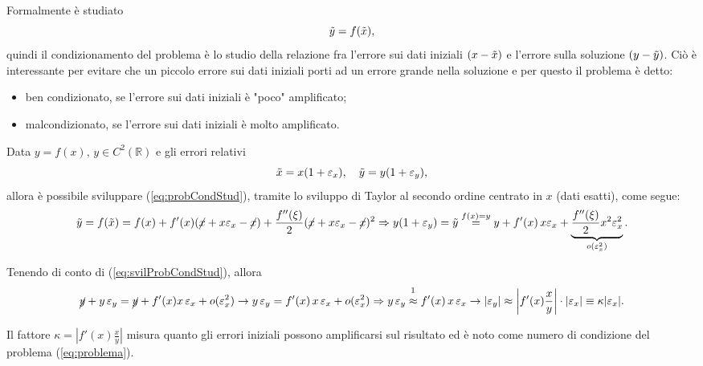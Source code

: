 Formalmente è studiato
\begin{equation}\label{eq:probCondStud}
	\Tilde{y}=f(\Tilde{x}),
\end{equation}
quindi il condizionamento del problema è lo studio della relazione fra l'errore sui dati iniziali $(x-\Tilde{x})$ e l'errore sulla soluzione $(y-\Tilde{y})$. Ciò è interessante per evitare che un piccolo errore sui dati iniziali porti ad un errore grande nella soluzione e per questo il problema è detto:
\begin{itemize}
	\item ben condizionato, se l'errore sui dati iniziali è "poco" amplificato;
	\item malcondizionato, se l'errore sui dati iniziali è molto amplificato.
\end{itemize}

Data $y=f(x),\, y\in C^2(\mathbb{R})$ e gli errori relativi \begin{equation*}
	\Tilde{x}=x(1+\varepsilon_x),\quad \Tilde{y}=y(1+\varepsilon_y),
\end{equation*}
allora è possibile sviluppare (\ref{eq:probCondStud}), tramite lo sviluppo di Taylor al secondo ordine centrato in $x$ (dati esatti), come segue:
\begin{equation}\label{eq:svilProbCondStud}
	\Tilde{y}=f(\Tilde{x})=f(x)+f'(x)(\cancel{x}+x\varepsilon_x-\cancel{x})+\frac{f''(\xi)}{2}(\cancel{x}+x\varepsilon_x-\cancel{x})^2\Rightarrow y(1+\varepsilon_y)=\Tilde{y}\overset{f(x)=y}{=}y+f'(x)\, x\varepsilon_x+\underbrace{\frac{f''(\xi)}{2}x^2\varepsilon_x^2}_{o(\varepsilon_x^2)}.
\end{equation}

Tenendo di conto di (\ref{eq:svilProbCondStud}), allora
\begin{equation*}
	\cancel{y}+y\,\varepsilon_y=\cancel{y}+f'(x)x\,\varepsilon_x+o(\varepsilon_x^2)\rightarrow y\,\varepsilon_y=f'(x)\,x\,\varepsilon_x+o(\varepsilon_x^2)\Rightarrow y\,\varepsilon_y \overset{\footnotemark}{\approx}f'(x)\,x\,\varepsilon_x \rightarrow |\varepsilon_y|\approx \left|f'(x)\frac{x}{y}\right|\cdot|\varepsilon_x|\equiv\kappa |\varepsilon_x|.
\end{equation*}


\begin{definition}\label{def:condizionamento_problema}
	Il fattore $\kappa = \left|f'(x)\frac{x}{y}\right|$ misura quanto gli errori iniziali possono amplificarsi sul risultato ed è noto come numero di condizione del problema (\ref{eq:problema}).
\end{definition}

